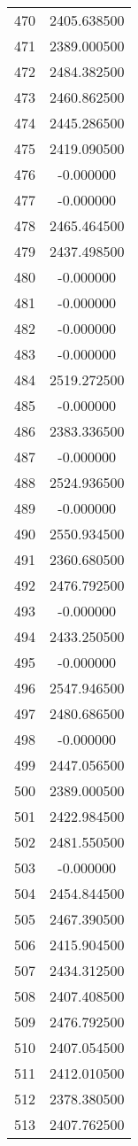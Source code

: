 \documentclass[12pt]{article}
\begin{document}
\begin{longtable}{@{}cc@{}}
470 & 2405.638500 \\
471 & 2389.000500 \\
472 & 2484.382500 \\
473 & 2460.862500 \\
474 & 2445.286500 \\
475 & 2419.090500 \\
476 & -0.000000 \\
477 & -0.000000 \\
478 & 2465.464500 \\
479 & 2437.498500 \\
480 & -0.000000 \\
481 & -0.000000 \\
482 & -0.000000 \\
483 & -0.000000 \\
484 & 2519.272500 \\
485 & -0.000000 \\
486 & 2383.336500 \\
487 & -0.000000 \\
488 & 2524.936500 \\
489 & -0.000000 \\
490 & 2550.934500 \\
491 & 2360.680500 \\
492 & 2476.792500 \\
493 & -0.000000 \\
494 & 2433.250500 \\
495 & -0.000000 \\
496 & 2547.946500 \\
497 & 2480.686500 \\
498 & -0.000000 \\
499 & 2447.056500 \\
500 & 2389.000500 \\
501 & 2422.984500 \\
502 & 2481.550500 \\
503 & -0.000000 \\
504 & 2454.844500 \\
505 & 2467.390500 \\
506 & 2415.904500 \\
507 & 2434.312500 \\
508 & 2407.408500 \\
509 & 2476.792500 \\
510 & 2407.054500 \\
511 & 2412.010500 \\
512 & 2378.380500 \\
513 & 2407.762500 \\

\end{longtable}
\end{document}
